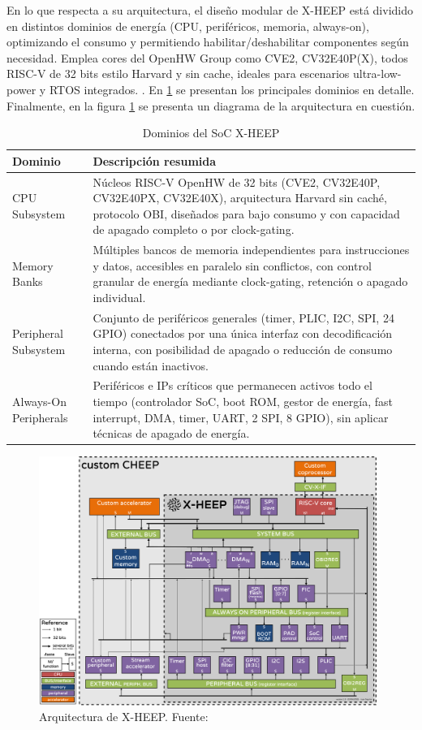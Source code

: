 En lo que respecta a su arquitectura, el diseño modular de X-HEEP está dividido en distintos dominios de energía (CPU, periféricos, memoria, always-on), optimizando el consumo y permitiendo habilitar/deshabilitar componentes según necesidad. Emplea cores del OpenHW Group como CVE2, CV32E40P(X), todos RISC-V de 32 bits estilo Harvard y sin cache, ideales para escenarios ultra-low-power y RTOS integrados. \cite{xheepDocs}. En \ref{tbl:xheepArch} se presentan los principales dominios en detalle. Finalmente, en la figura \ref{fig:xheepArch} se presenta un diagrama de la arquitectura en cuestión.

\begin{table}[h!]
\centering
\caption{Dominios del SoC X-HEEP}
\label{tab:dominios_xheep_texto}
\begin{tabular}{|l|p{9cm}|}
\hline
\textbf{Dominio} & \textbf{Descripción resumida} \\ \hline
CPU Subsystem & Núcleos RISC-V OpenHW de 32 bits (CVE2, CV32E40P, CV32E40PX, CV32E40X), arquitectura Harvard sin caché, protocolo OBI, diseñados para bajo consumo y con capacidad de apagado completo o por clock-gating. \\ \hline
Memory Banks & Múltiples bancos de memoria independientes para instrucciones y datos, accesibles en paralelo sin conflictos, con control granular de energía mediante clock-gating, retención o apagado individual. \\ \hline
Peripheral Subsystem & Conjunto de periféricos generales (timer, PLIC, I2C, SPI, 24 GPIO) conectados por una única interfaz con decodificación interna, con posibilidad de apagado o reducción de consumo cuando están inactivos. \\ \hline
Always-On Peripherals & Periféricos e IPs críticos que permanecen activos todo el tiempo (controlador SoC, boot ROM, gestor de energía, fast interrupt, DMA, timer, UART, 2 SPI, 8 GPIO), sin aplicar técnicas de apagado de energía. \\ \hline
\end{tabular}
\label{tbl:xheepArch}
\end{table}

\begin{figure}[!ht]
  \centering
  \includegraphics[width=11cm]{figures/xheepArch.png}
  \caption{Arquitectura de X-HEEP. Fuente: \cite{xheepInfo}}
  \label{fig:xheepArch}
\end{figure}



